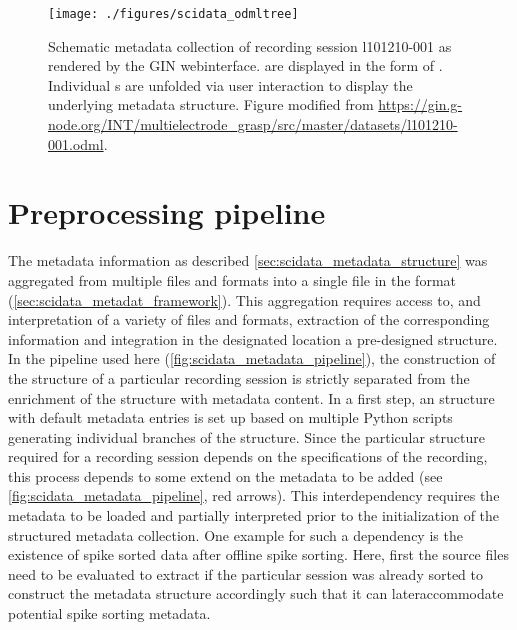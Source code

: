\begin{figure}
 \texttt{[image: ./figures/scidata\_odmltree]}
 \caption[Schematic metadata collection of session l101210-001]{Schematic metadata collection of recording session l101210-001 as rendered by the GIN webinterface.  are displayed in the form of . Individual s are unfolded via user interaction to display the underlying metadata structure. Figure modified from \url{https://gin.g-node.org/INT/multielectrode_grasp/src/master/datasets/l101210-001.odml}.}
 \label{fig:scidata_l101210odml}
\end{figure}

\section{Preprocessing pipeline}
\label{sec:r2g_preprocessing_pipeline}
The metadata information as described \cref{sec:scidata_metadata_structure} was aggregated from multiple files and formats into a single file in the  format (\cref{sec:scidata_metadat_framework}). This aggregation requires access to, and interpretation of a variety of files and formats, extraction of the corresponding information and integration in the designated location a pre-designed  structure. In the pipeline used here (\cref{fig:scidata_metadata_pipeline}), the construction of the  structure of a particular recording session is strictly separated from the enrichment of the structure with metadata content. In a first step, an  structure with default metadata entries is set up based on multiple Python scripts generating individual branches of the  structure. Since the particular structure required for a recording session depends on the specifications of the recording, this process depends to some extend on the metadata to be added (see \cref{fig:scidata_metadata_pipeline}, red arrows). This interdependency requires the metadata to be loaded and partially interpreted prior to the initialization of the structured metadata collection. One example for such a dependency is the existence of spike sorted data after offline spike sorting. Here, first the source files need to be evaluated to extract if the particular session was already sorted to construct the metadata structure accordingly such that it can lateraccommodate potential spike sorting metadata.

